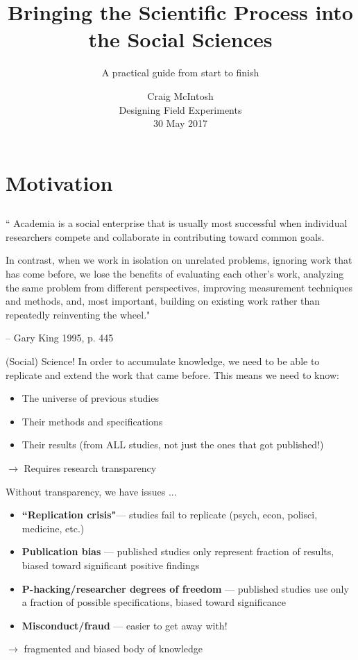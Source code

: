 \documentclass[12pt, compress]{beamer} %
\title[Short Title]{Bringing the Scientific Process into the Social Sciences}
\subtitle{A practical guide from start to finish \vspace{-20pt} }
\institute{\vspace{10pt} \ig[width = 40mm]{pdel.png}\vspace{10pt} \ig[width = 20mm]{UCSDlogo}}
\date[Short Occasion]{Craig McIntosh \\ Designing Field Experiments \\ 30 May 2017}
\let\noteitem\item %
\renewcommand{\item}{ 
	\noteitem\vspace{\fill}
	}
\newcommand{\nb}[1]{{\color{burntorange} {#1}}}
\begin{document}

{ %
\frame{
  \titlepage
  \note{}
  }
}

\section{Motivation}
\subsection{}
	\begin{frame}
		``\nb{Academia is a social enterprise} that is usually most successful when individual researchers \nb{compete and collaborate} in contributing toward common goals. 
		
		\bigskip
		In contrast, when we work in isolation on unrelated problems, ignoring work that has come before, we lose the benefits of evaluating each other's work, analyzing the same problem from different perspectives, improving measurement techniques and methods, and, most important, \nb{building on existing work rather than repeatedly reinventing the wheel}."
		
		\bigskip
		 -- Gary King 1995, p. 445
	\end{frame}

	\begin{frame}{(Social) Science!}
		 In order to \nb{accumulate knowledge}, we need to be able to replicate and extend the work that came before. This means we need to know:
		 \begin{itemize}
		 	\item The universe of previous studies
		 	\item Their methods and specifications
		 	\item Their results (from ALL studies, not just the ones that got published!)
		 \end{itemize}
		 \bigskip
		 $\rightarrow$ Requires research \nb{transparency}
	\end{frame}

	\begin{frame}{Without transparency, we have issues ...}
		\begin{itemize}
			\item \textbf{``Replication crisis"}--- studies fail to replicate (psych, econ, polisci, medicine, etc.)
			\item \textbf{Publication bias} --- published studies only represent fraction of results, biased toward significant positive findings
			\item \textbf{P-hacking/researcher degrees of freedom} --- published studies use only a fraction of possible specifications, biased toward significance 
			\item \textbf{Misconduct/fraud} --- easier to get away with!
		\end{itemize}			
		\bigskip
		$\rightarrow$ \nb{fragmented} and \nb{biased} body of knowledge
		
	\end{frame}
	
\end{document}
